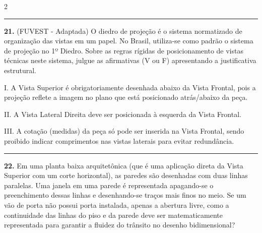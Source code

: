 \documentclass[twoside, 10pt, a4paper]{article}
\begin{document}
\begin{multicols*}{2}
\noindent\textcolor{CorLinha}{\rule{\linewidth}{0.5pt}} 
\par\par\vspace{0.5cm}
\textbf{21.} (FUVEST - Adaptada) O diedro de projeção é o sistema normatizado de organização das vistas em um papel. No Brasil, utiliza-se como padrão o sistema de projeção no 1º Diedro. Sobre as regras rígidas de posicionamento de vistas técnicas neste sistema, julgue as afirmativas (V ou F) apresentando a justificativa estrutural.

I. A Vista Superior é obrigatoriamente desenhada abaixo da Vista Frontal, pois a projeção reflete a imagem no plano que está posicionado atrás/abaixo da peça.\par\par\vspace{0.5cm}
II. A Vista Lateral Direita deve ser posicionada à esquerda da Vista Frontal.\par\par\vspace{0.5cm}
III. A cotação (medidas) da peça só pode ser inserida na Vista Frontal, sendo proibido indicar comprimentos nas vistas laterais para evitar redundância.
\par\vspace{0.5cm}

\noindent\textcolor{CorLinha}{\rule{\linewidth}{0.5pt}} 
\par\par\vspace{0.5cm}
\textbf{22.} Em uma planta baixa arquitetônica (que é uma aplicação direta da Vista Superior com um corte horizontal), as paredes são desenhadas com duas linhas paralelas. Uma janela em uma parede é representada apagando-se o preenchimento dessas linhas e desenhando-se traços mais finos no meio. Se um vão de porta não possui porta instalada, apenas a abertura livre, como a continuidade das linhas do piso e da parede deve ser matematicamente representada para garantir a fluidez do trânsito no desenho bidimensional?
\par\vspace{0.5cm}


\end{multicols*}
\end{document}
